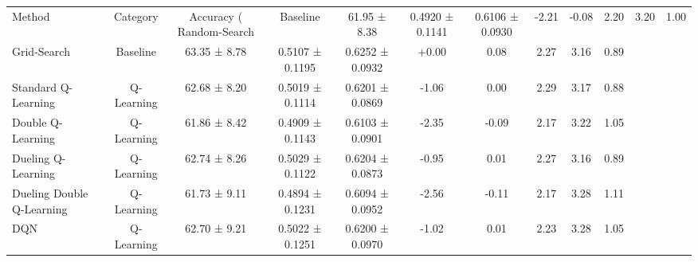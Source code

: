 \begin{tabular}{lcccccccccc}
\toprule
Method & Category & Accuracy (%
\midrule
Random-Search & Baseline & 61.95 ± 8.38 & 0.4920 ± 0.1141 & 0.6106 ± 0.0930 & -2.21 & -0.08 & 2.20 & 3.20 & 1.00 \\
Grid-Search & Baseline & 63.35 ± 8.78 & 0.5107 ± 0.1195 & 0.6252 ± 0.0932 & +0.00 & 0.08 & 2.27 & 3.16 & 0.89 \\
Standard Q-Learning & Q-Learning & 62.68 ± 8.20 & 0.5019 ± 0.1114 & 0.6201 ± 0.0869 & -1.06 & 0.00 & 2.29 & 3.17 & 0.88 \\
Double Q-Learning & Q-Learning & 61.86 ± 8.42 & 0.4909 ± 0.1143 & 0.6103 ± 0.0901 & -2.35 & -0.09 & 2.17 & 3.22 & 1.05 \\
Dueling Q-Learning & Q-Learning & 62.74 ± 8.26 & 0.5029 ± 0.1122 & 0.6204 ± 0.0873 & -0.95 & 0.01 & 2.27 & 3.16 & 0.89 \\
Dueling Double Q-Learning & Q-Learning & 61.73 ± 9.11 & 0.4894 ± 0.1231 & 0.6094 ± 0.0952 & -2.56 & -0.11 & 2.17 & 3.28 & 1.11 \\
DQN & Q-Learning & 62.70 ± 9.21 & 0.5022 ± 0.1251 & 0.6200 ± 0.0970 & -1.02 & 0.01 & 2.23 & 3.28 & 1.05 \\
\bottomrule
\end{tabular}
